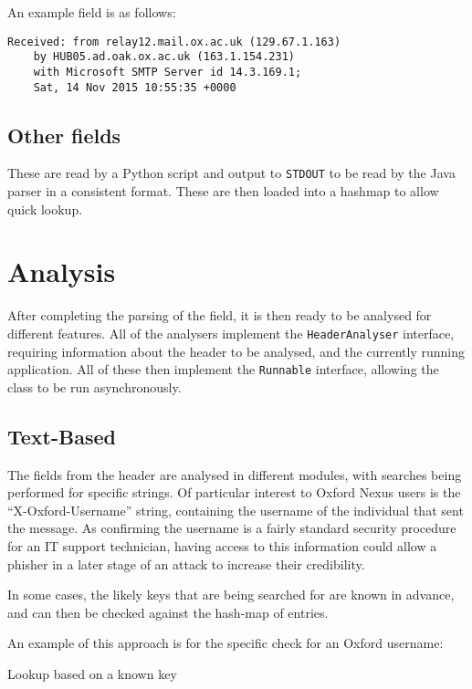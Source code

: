 An example field is as follows:
\begin{verbatim}
Received: from relay12.mail.ox.ac.uk (129.67.1.163) 
    by HUB05.ad.oak.ox.ac.uk (163.1.154.231) 
    with Microsoft SMTP Server id 14.3.169.1;
    Sat, 14 Nov 2015 10:55:35 +0000
\end{verbatim}
\subsection{Other fields}
These are read by a Python script and output to \texttt{STDOUT} to be read by the Java parser in a consistent format.  These are then loaded into a hashmap to allow quick lookup.

\section{Analysis}
After completing the parsing of the field, it is then ready to be analysed for different features.  All of the analysers implement the \texttt{HeaderAnalyser} interface, requiring information about the header to be analysed, and the currently running application.  All of these then implement the \texttt{Runnable} interface, allowing the class to be run asynchronously.

\subsection{Text-Based}
The fields from the header are analysed in different modules, with searches being performed for specific strings.  Of particular interest to Oxford Nexus users is the ``X-Oxford-Username'' string, containing the username of the individual that sent the message.  As confirming the username is a fairly standard security procedure for an IT support technician, having access to this information could allow a phisher in a later stage of an attack to increase their credibility.

In some cases, the likely keys that are being searched for are known in advance, and can then be checked against the hash-map of entries.

An example of this approach is for the specific check for an Oxford username:

\begin{algorithm}
	\caption{Lookup based on a known key}
\end{algorithm}

